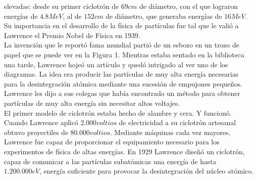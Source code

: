 \documentclass[12pt]{article}
\begin{document}
				elevadas: desde su primer ciclotrón de $ 69 cm $ de diámetro, con el que lograron energías de 
				$ 4.8 MeV $, al de $ 152 cm $ de diámetro, que generaba energías de $ 16 MeV $. Su importancia 
				en el desarrollo de la física de partículas fue tal que le valió a Lawrence el Premio Nobel de Física en 
				1939. \\
				La invención que le reportó fama mundial partió de un esbozo en un trozo de papel que se puede ver en la Figura 1. Mientras 
				estaba sentado en la biblioteca una tarde, Lawrence hojeó un artículo y quedó intrigado al ver uno 
				de los diagramas. La idea era producir las partículas de muy alta energía necesarias para la 
				desintegración atómica mediante una sucesión de empujones pequeños. Lawrence les dijo a sus 
				colegas que había encontrado un método para obtener partículas de muy alta energía sin 
				necesitar altos voltajes. \\
				El primer modelo de ciclotrón estaba hecho de alambre y cera. Y funcionó. Cuando Lawrence 
				aplicó $ 2.000 voltios $ de electricidad a su ciclotrón artesanal obtuvo proyectiles de $ 80.000 voltios $. 
				Mediante máquinas cada vez mayores, Lawrence fue capaz de proporcionar el 
				equipamiento necesario para los experimentos de física de altas energías. En 1929 Lawrence 
				diseñó un ciclotrón, capaz de comunicar a las partículas subatómicas una energía de hasta 
				$ 1.200.000 eV $, energía suficiente para provocar la desintegración del núcleo atómico.
\end{document}
